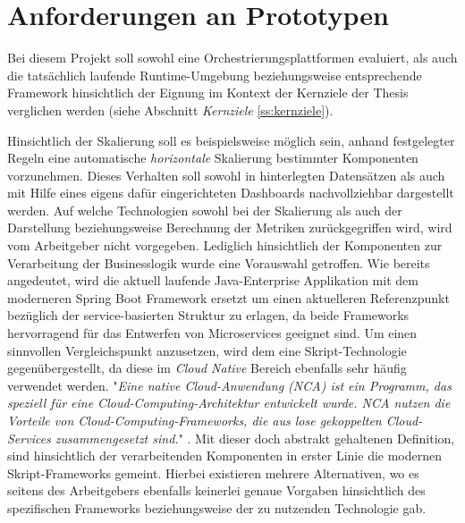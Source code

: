 \section{Anforderungen an Prototypen}

Bei diesem Projekt soll sowohl eine Orchestrierungsplattformen evaluiert, als auch die tatsächlich laufende Runtime-Umgebung beziehungsweise entsprechende Framework hinsichtlich der Eignung im Kontext der Kernziele der Thesis verglichen werden (siehe Abschnitt \emph{Kernziele} \ref{ss:kernziele}). 

Hinsichtlich der Skalierung soll es beispielsweise möglich sein, anhand festgelegter Regeln eine automatische \emph{horizontale} Skalierung bestimmter Komponenten vorzunehmen. Dieses Verhalten soll sowohl in hinterlegten Datensätzen als auch mit Hilfe eines eigens dafür eingerichteten Dashboards nachvollziehbar dargestellt werden. Auf welche Technologien sowohl bei der Skalierung als auch der Darstellung beziehungsweise Berechnung der Metriken zurückgegriffen wird, wird vom Arbeitgeber nicht vorgegeben. Lediglich hinsichtlich der Komponenten zur Verarbeitung der Businesslogik wurde eine Vorauswahl getroffen. Wie bereits angedeutet, wird die aktuell laufende Java-Enterprise Applikation mit dem moderneren Spring Boot Framework ersetzt um einen aktuelleren Referenzpunkt bezüglich der service-basierten Struktur zu erlagen, da beide Frameworks hervorragend für das Entwerfen von Microservices geeignet sind. Um einen sinnvollen Vergleichspunkt anzusetzen, wird dem eine Skript-Technologie gegenübergestellt, da diese im \emph{Cloud Native} Bereich ebenfalls sehr häufig verwendet werden. "\emph{Eine native Cloud-Anwendung (NCA) ist ein Programm, das speziell für eine Cloud-Computing-Architektur entwickelt wurde. NCA nutzen die Vorteile von Cloud-Computing-Frameworks, die aus lose gekoppelten Cloud-Services zusammengesetzt sind.}" \cite{def-nca}. Mit dieser doch abstrakt gehaltenen Definition, sind hinsichtlich der verarbeitenden Komponenten in erster Linie die modernen Skript-Frameworks gemeint. Hierbei existieren mehrere Alternativen, wo es seitens des Arbeitgebers ebenfalls keinerlei genaue Vorgaben hinsichtlich des spezifischen Frameworks beziehungsweise der zu nutzenden Technologie gab.

